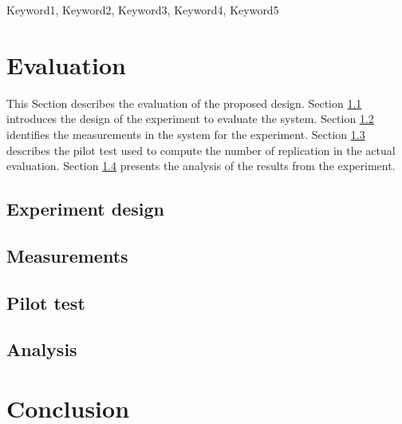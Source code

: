 \documentclass[conference]{IEEEtran}
\begin{document}
\maketitle
\IEEEpubidadjcol
\begin{abstract}





\end{abstract}

\begin{IEEEkeywords}
    Keyword1, Keyword2, Keyword3, Keyword4, Keyword5
\end{IEEEkeywords}



\vspace{1cm}



\vspace{1cm}



\vspace{1cm}


\vspace{1cm}


\section{Evaluation}
\label{sec:evaluation}
This Section describes the evaluation of the proposed design.
Section \ref{sec:design} introduces the design of the experiment to evaluate the system.
Section \ref{sec:measurements} identifies the measurements in the system for the experiment.
Section \ref{sec:pilot_test} describes the pilot test used to compute the number of replication in the actual evaluation.
Section \ref{sec:analysis} presents the analysis of the results from the experiment.


\subsection{Experiment design}
\label{sec:design}


\subsection{Measurements}
\label{sec:measurements}


\subsection{Pilot test}
\label{sec:pilot_test}

\subsection{Analysis}
\label{sec:analysis}



\section{Conclusion}




\vspace{12pt}
\end{document}
